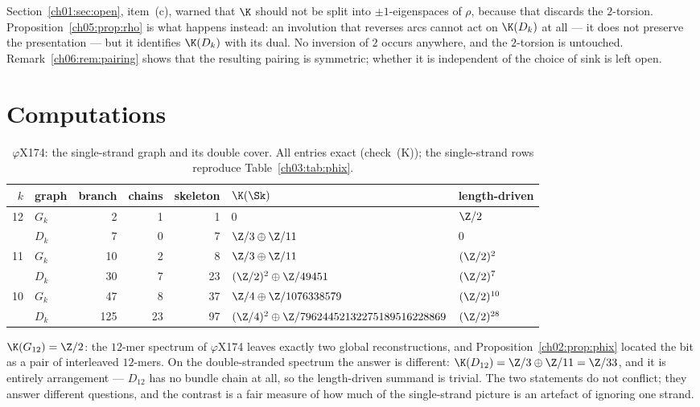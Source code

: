 \begin{remark}\label{ch05:rem:nosplit}
Section~\ref{ch01:sec:open}, item~(c), warned that $\K$ should not be split into $\pm1$-eigenspaces of
$\rho$, because that discards the $2$-torsion. Proposition~\ref{ch05:prop:rho} is what happens
instead: an involution that reverses arcs cannot act on $\K(D_k)$ at all --- it does not
preserve the presentation --- but it identifies $\K(D_k)$ with its dual. No inversion of
$2$ occurs anywhere, and the $2$-torsion is untouched. Remark~\ref{ch06:rem:pairing} shows that
the resulting pairing is symmetric; whether it is independent of the choice of sink is left
open.
\end{remark}

\section{Computations}\label{ch05:sec:comp}

\begin{table}[ht]
\centering\footnotesize
\begin{tabular}{rlrrrll}
\toprule
$k$ & graph & branch & chains & skeleton & $\K(\Sk)$ & length-driven\\
\midrule
12 & $G_k$ &   2 &  1 &  1 & $0$ & $\Z/2$\\
   & $D_k$ &   7 &  0 &  7 & $\Z/3\oplus\Z/11$ & $0$\\[2pt]
11 & $G_k$ &  10 &  2 &  8 & $\Z/3\oplus\Z/11$ & $(\Z/2)^{2}$\\
   & $D_k$ &  30 &  7 & 23 & $(\Z/2)^{2}\oplus\Z/49451$ & $(\Z/2)^{7}$\\[2pt]
10 & $G_k$ &  47 &  8 & 37 & $\Z/4\oplus\Z/1076338579$ & $(\Z/2)^{10}$\\
   & $D_k$ & 125 & 23 & 97 & $(\Z/4)^{2}\oplus\Z/79624452132275189516228869$ & $(\Z/2)^{28}$\\
\bottomrule
\end{tabular}
\caption{$\varphi$X174: the single-strand graph and its double cover. All entries exact
(check~(K)); the single-strand rows reproduce Table~\ref{ch03:tab:phix}.}
\label{ch05:tab:phix}
\end{table}

\begin{remark}\label{ch05:rem:bit}
$\K(G_{12})=\Z/2$: the $12$-mer spectrum of $\varphi$X174 leaves exactly two global
reconstructions, and Proposition~\ref{ch02:prop:phix} located the bit as a pair of interleaved $12$-mers. On
the double-stranded spectrum the answer is different: $\K(D_{12})=\Z/3\oplus\Z/11=\Z/33$,
and it is entirely arrangement --- $D_{12}$ has no bundle chain at all, so the
length-driven summand is trivial. The two statements do not conflict; they answer
different questions, and the contrast is a fair measure of how much of the single-strand
picture is an artefact of ignoring one strand.
\end{remark}

